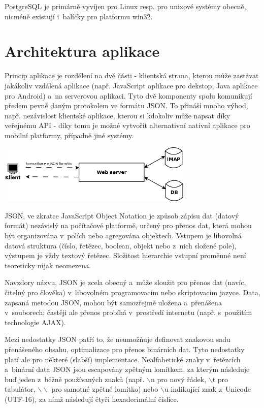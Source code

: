\documentclass[bc,male,html,dept460]{diploma}				%
\begin{document}
PostgreSQL je primárně vyvíjen pro Linux resp. pro unixové systémy obecně, nicméně existují i~balíčky pro platformu win32.
\cite{postgres-wiki}

\section{Architektura aplikace}
\label{sec:architektura}

Princip aplikace je rozdělení na dvě části - klientská strana,
kterou může zastávat jakákoliv vzdálená aplikace (např. JavaScript aplikace pro dekstop, Java aplikace pro Android)
a~na serverovou aplikaci. Tyto dvě komponenty spolu komunikují předem pevně daným protokolem ve formátu JSON.
To přináší mnoho výhod, např. nezávislost klientské aplikace, 
kterou si kdokoliv může napsat díky veřejnému API - díky tomu je možné vytvořit alternativní nativní aplikace pro mobilní platformy,
případně jiné systémy.

\includegraphics[width=0.7\textwidth]{../applicationArchitecture.png} 

JSON, ve zkratce JavaScript Object Notation je způsob zápisu dat (datový formát) nezávislý na počítačové platformě,
určený pro přenos dat, která mohou být organizována v~polích nebo agregována objektech.
Vstupem je libovolná datová struktura (číslo, řetězec, boolean, objekt nebo z~nich složené pole), výstupem je vždy textový řetězec.
Složitost hierarchie vstupní proměnné není teoreticky nijak neomezena.

Navzdory názvu, JSON je zcela obecný a~může sloužit pro přenos dat (navíc, čitelný pro člověka)
v~libovolném programovacím nebo skriptovacím jazyce.
Data, zapsaná metodou JSON, mohou být samozřejmě uložena a~přenášena v~souborech;
častěji ale přenos probíhá v~prostředí internetu (např. s~použitím technologie AJAX).

Mezi nedostatky JSON patří to, že neumožňuje definovat znakovou sadu přenášeného obsahu,
optimalizace pro přenos binárních dat. Tyto nedostatky platí ale pro některé (slabší) implementace.
Nealfabetické znaky v~řetězcích a~binární data JSON jsou escapovány zpětným lomítkem,
za kterým následuje buď jeden z~běžně používaných znaků (např. $\backslash$n pro nový řádek, $\backslash$t pro tabulátor, $\backslash\backslash$ pro samotné zpětné lomítko) nebo $\backslash$u indikující znak z~Unicode (UTF-16), za nímž následují čtyři hexadecimální číslice.
\end{document}
